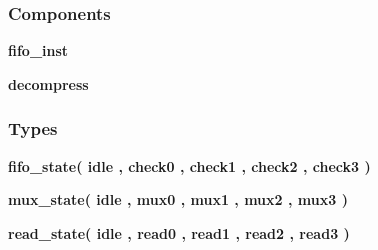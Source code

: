 \subsubsection*{Components}
 \begin{DoxyCompactItemize}
\item 
{\bf fifo\+\_\+inst}  {\bfseries }  
\item 
{\bf decompress}  {\bfseries }  
\end{DoxyCompactItemize}
\subsubsection*{Types}
 \begin{DoxyCompactItemize}
\item 
{\bfseries {\bf fifo\+\_\+state}{\bfseries \textcolor{vhdlchar}{(}\textcolor{vhdlchar}{ }\textcolor{vhdlchar}{idle}\textcolor{vhdlchar}{ }\textcolor{vhdlchar}{,}\textcolor{vhdlchar}{ }\textcolor{vhdlchar}{check0}\textcolor{vhdlchar}{ }\textcolor{vhdlchar}{,}\textcolor{vhdlchar}{ }\textcolor{vhdlchar}{check1}\textcolor{vhdlchar}{ }\textcolor{vhdlchar}{,}\textcolor{vhdlchar}{ }\textcolor{vhdlchar}{check2}\textcolor{vhdlchar}{ }\textcolor{vhdlchar}{,}\textcolor{vhdlchar}{ }\textcolor{vhdlchar}{check3}\textcolor{vhdlchar}{ }\textcolor{vhdlchar}{)}\textcolor{vhdlchar}{ }}} 
\item 
{\bfseries {\bf mux\+\_\+state}{\bfseries \textcolor{vhdlchar}{(}\textcolor{vhdlchar}{ }\textcolor{vhdlchar}{idle}\textcolor{vhdlchar}{ }\textcolor{vhdlchar}{,}\textcolor{vhdlchar}{ }\textcolor{vhdlchar}{mux0}\textcolor{vhdlchar}{ }\textcolor{vhdlchar}{,}\textcolor{vhdlchar}{ }\textcolor{vhdlchar}{mux1}\textcolor{vhdlchar}{ }\textcolor{vhdlchar}{,}\textcolor{vhdlchar}{ }\textcolor{vhdlchar}{mux2}\textcolor{vhdlchar}{ }\textcolor{vhdlchar}{,}\textcolor{vhdlchar}{ }\textcolor{vhdlchar}{mux3}\textcolor{vhdlchar}{ }\textcolor{vhdlchar}{)}\textcolor{vhdlchar}{ }}} 
\item 
{\bfseries {\bf read\+\_\+state}{\bfseries \textcolor{vhdlchar}{(}\textcolor{vhdlchar}{ }\textcolor{vhdlchar}{idle}\textcolor{vhdlchar}{ }\textcolor{vhdlchar}{,}\textcolor{vhdlchar}{ }\textcolor{vhdlchar}{read0}\textcolor{vhdlchar}{ }\textcolor{vhdlchar}{,}\textcolor{vhdlchar}{ }\textcolor{vhdlchar}{read1}\textcolor{vhdlchar}{ }\textcolor{vhdlchar}{,}\textcolor{vhdlchar}{ }\textcolor{vhdlchar}{read2}\textcolor{vhdlchar}{ }\textcolor{vhdlchar}{,}\textcolor{vhdlchar}{ }\textcolor{vhdlchar}{read3}\textcolor{vhdlchar}{ }\textcolor{vhdlchar}{)}\textcolor{vhdlchar}{ }}} 
\item 

\end{DoxyCompactItemize}
